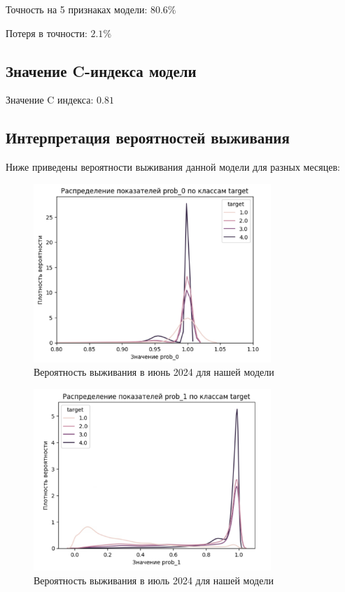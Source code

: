 \documentclass[a4paper,14pt,oneside,openany]{memoir}
\begin{document}
Точность на 5 признаках модели: $80.6\%$

Потеря в точности: $2.1\%$

\subsection{Значение C-индекса модели}

Значение C индекса: $0.81$

\subsection{Интерпретация вероятностей выживания}

Ниже приведены вероятности выживания данной модели для разных месяцев: 

\begin{figure}[H]
	\includegraphics[width=0.8\textwidth]{../figures/prob_0_our.png}
	\caption{Вероятность выживания в июнь 2024 для нашей модели}
\end{figure}

\begin{figure}[H]
	\includegraphics[width=0.8\textwidth]{../figures/prob_1_our.png}
	\caption{Вероятность выживания в июль 2024 для нашей модели}
\end{figure}
\end{document}
